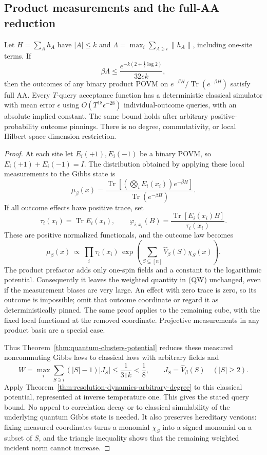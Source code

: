 \subsection{Product measurements and the full-AA reduction}
\label{quantum-clusters:measurement}

\begin{corollary}
\label{cor:quantum-clusters-full-aa}
Let $H=\sum_A h_A$ have $|A|\le k$ and
$\Lambda=\max_i\sum_{A\ni i}\|h_A\|$, including one-site terms.
If
\[
 \beta\Lambda\le\frac{e^{-k(2+\frac12\log2)}}{32ek},
\]
then the outcomes of any binary product POVM on
$e^{-\beta H}/\operatorname{Tr}(e^{-\beta H})$ satisfy full AA.
Every $T$-query acceptance function has a deterministic classical
simulator with mean error $\epsilon$ using
$O(T^{18}\epsilon^{-28})$ individual-outcome queries, with an
absolute implied constant. The same bound holds after arbitrary
positive-probability outcome pinnings. There is no degree,
commutativity, or local Hilbert-space dimension restriction.
\end{corollary}

\begin{proof}
At each site let \(E_i(+1),E_i(-1)\) be a binary POVM, so
\(E_i(+1)+E_i(-1)=I\).  The distribution obtained by applying these
local measurements to the Gibbs state is
\[
 \mu_\beta(x)=
 \frac{\operatorname{Tr}[(\bigotimes_i E_i(x_i))e^{-\beta H}]}
      {\operatorname{Tr}(e^{-\beta H})}.
\]
If all outcome effects have positive trace, set
\[
 \tau_i(x_i)=\operatorname{Tr}E_i(x_i),\qquad
 \varphi_{i,x_i}(B)=
     \frac{\operatorname{Tr}[E_i(x_i)B]}{\tau_i(x_i)}.
\]
These are positive normalized functionals, and the outcome law becomes
\[
 \mu_\beta(x)\ \propto\
 \prod_i\tau_i(x_i)\,
 \exp\!\left(\sum_{S\subseteq[n]}
                  \widehat V_\beta(S)\chi_S(x)\right).
 \tag{QMEAS}
\]
The product prefactor adds only one-spin fields and a constant to the
logarithmic potential.  Consequently it leaves the weighted quantity
in (QW) unchanged, even if the measurement biases are very large.
An effect with zero trace is zero, so its outcome is impossible; omit
that outcome coordinate or regard it as deterministically pinned.
The same proof applies to the remaining cube, with the fixed local
functional at the removed coordinate.  Projective measurements in any
product basis are a special case.

Thus Theorem~\ref{thm:quantum-clusters-potential} reduces these measured
noncommuting Gibbs laws to classical laws with arbitrary fields and
\[
 W=\max_i\sum_{S\ni i}(|S|-1)|J_S|\le\frac1{31k}<\frac18,
 \qquad J_S=\widehat V_\beta(S)\quad (|S|\ge2).
\]
Apply Theorem~\ref{thm:resolution-dynamics-arbitrary-degree} to this
classical potential, represented at inverse temperature one. This gives
the stated query bound. No appeal to correlation decay or to classical
simulability of the underlying quantum Gibbs state is needed.
It also preserves hereditary versions: fixing measured coordinates
turns a monomial \(\chi_S\) into a signed monomial on a subset of
\(S\), and the triangle inequality shows that the remaining weighted
incident norm cannot increase.
\end{proof}

